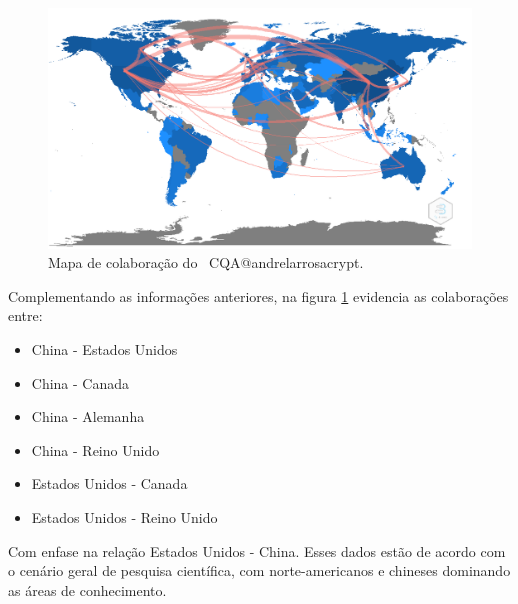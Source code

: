 \begin{figure}
    \centering
    \includegraphics[angle=0,width=1\textwidth]{experiments/andrelarrosacrypt/AnaliseBibliometrica/CriptografiaQuantica/imagens/CQA@andrelarrosacrypt_ColabMap.png}
    \caption{Mapa de colaboração do \dataset\ CQA@andrelarrosacrypt.}
    \label{CQA@andrelarrosacrypt_ColabMap}
\end{figure}

Complementando as informações anteriores, na figura \ref{CQA@andrelarrosacrypt_ColabMap} evidencia as colaborações entre:

\begin{itemize}
    \item China - Estados Unidos
    \item China - Canada
    \item China - Alemanha
    \item China - Reino Unido
    \item Estados Unidos - Canada
    \item Estados Unidos - Reino Unido
\end{itemize}

Com enfase na relação Estados Unidos - China. Esses dados estão de acordo com o cenário geral de pesquisa científica, com norte-americanos e chineses dominando as áreas de conhecimento.